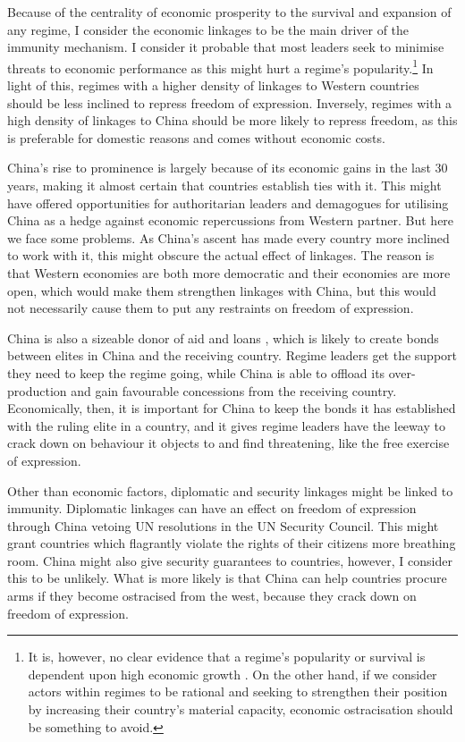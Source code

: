 Because of the centrality of economic prosperity to the survival and expansion of any regime, I consider the economic linkages to be the main driver of the immunity mechanism. I consider it probable that most leaders seek to minimise threats to economic performance as this might hurt a regime's popularity.\footnote{It is, however, no clear evidence that a regime's popularity or survival is dependent upon high economic growth \citep{chu_sources_2013, stockemer_economic_2020}. On the other hand, if we consider actors within regimes to be rational and seeking to strengthen their position by increasing their country's material capacity, economic ostracisation should be something to avoid.} In light of this, regimes with a higher density of linkages to Western countries should be less inclined to repress freedom of expression. Inversely, regimes with a high density of linkages to China should be more likely to repress freedom, as this is preferable for domestic reasons and comes without economic costs. 

China's rise to prominence is largely because of its economic gains in the last 30 years, making it almost certain that countries establish ties with it. This might have offered opportunities for authoritarian leaders and demagogues for utilising China as a hedge against economic repercussions from Western partner. But here we face some problems. As China's ascent has made every country more inclined to work with it, this might obscure the actual effect of linkages. The reason is that Western economies are both more democratic and their economies are more open, which would make them strengthen linkages with China, but this would not necessarily cause them to put any restraints on freedom of expression. 

China is also a sizeable donor of aid and loans \citep{fuchs_why_2022}, which is likely to create bonds between elites in China and the receiving country. Regime leaders get the support they need to keep the regime going, while China is able to offload its over-production and gain favourable concessions from the receiving country. Economically, then, it is important for China to keep the bonds it has established with the ruling elite in a country, and it gives regime leaders have the leeway to crack down on behaviour it objects to and find threatening, like the free exercise of expression.

Other than economic factors, diplomatic and security linkages might be linked to immunity. Diplomatic linkages can have an effect on freedom of expression through China vetoing UN resolutions in the UN Security Council. This might grant countries which flagrantly violate the rights of their citizens more breathing room. China might also give security guarantees to countries, however, I consider this to be unlikely. What is more likely is that China can help countries procure arms if they become ostracised from the west, because they crack down on freedom of expression.

